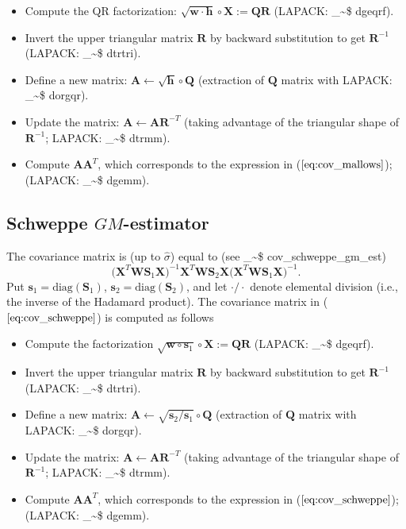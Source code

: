 \documentclass[a4paper,oneside,11pt,DIV=12]{scrartcl}
\makeatletter
\theoremstyle{remark}
\newcommand\code{\bgroup\@makeother\_\@makeother\~\@makeother\$\@makeother\^\@codex}
\def\@codex#1{{\normalfont\ttfamily\hyphenchar\font=-1 #1}\egroup}
\makeatother
\begin{document}
\begin{itemize}
    \item Compute the QR factorization: $\sqrt{\bm w \cdot \bm h} \circ \bm X
        := \bm Q \bm R$ (LAPACK: \code{dgeqrf}).
    \item Invert the upper triangular matrix $\bm R$ by backward substitution
        to get $\bm R^{-1}$ (LAPACK: \code{dtrtri}).
    \item Define a new matrix: $\bm A \leftarrow \sqrt{\bm h} \circ \bm Q$
        (extraction of $\bm Q$ matrix with LAPACK: \code{dorgqr}).
    \item Update the matrix: $\bm A \leftarrow \bm A \bm R^{-T}$ (taking
        advantage of the triangular shape of $\bm R^{-1}$; LAPACK:
        \code{dtrmm}).
    \item Compute $\bm A \bm A^T$, which corresponds to the expression in
        ($\ref{eq:cov_mallows}$); (LAPACK: \code{dgemm}).
\end{itemize}

\subsection{Schweppe $GM$-estimator}
The covariance matrix is (up to $\widehat{\sigma}$) equal to (see
\code{cov_schweppe_gm_est})
\begin{equation}\label{eq:cov_schweppe}
   \big(\bm X^T \bm W \bm S_1 \bm X\big)^{-1} \bm X^T \bm W \bm S_2 \bm X
    \big(\bm X^T \bm W \bm S_1 \bm X\big)^{-1}.
\end{equation}
\noindent Put $\bm s_1 = \mathrm{diag}(\bm S_1)$, $\bm s_2 = \mathrm{diag}(\bm
S_2)$, and let $\cdot / \cdot $ denote elemental division (i.e., the inverse of
the Hadamard product). The covariance matrix in ($\ref{eq:cov_schweppe}$) is
computed as follows

\begin{itemize}
    \item Compute the factorization $\sqrt{\bm w \circ \bm s_1} \circ \bm X :=
        \bm Q \bm R$ (LAPACK: \code{dgeqrf}).
    \item Invert the upper triangular matrix $\bm R$ by backward substitution
        to get $\bm R^{-1}$ (LAPACK: \code{dtrtri}).
    \item Define a new matrix: $\bm A \leftarrow \sqrt{\bm s_2 / \bm s_1 }
        \circ \bm Q$ (extraction of $\bm Q$ matrix with LAPACK: \code{dorgqr}).
    \item Update the matrix: $\bm A \leftarrow \bm A \bm R^{-T}$ (taking
        advantage of the triangular shape of $\bm R^{-1}$; LAPACK:
        \code{dtrmm}).
    \item Compute $\bm A \bm A^T$, which corresponds to the expression in
        ($\ref{eq:cov_schweppe}$); (LAPACK: \code{dgemm}).
\end{itemize}
\end{document}
